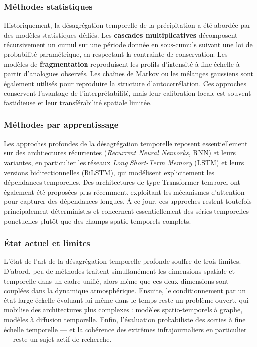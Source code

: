 \documentclass[14pt,a4paper,openany]{extreport}
\theoremstyle{definition}
\begin{document}
\subsubsection{Méthodes statistiques}

Historiquement, la désagrégation temporelle de la précipitation a été abordée par des modèles statistiques dédiés. Les \textbf{cascades multiplicatives} décomposent récursivement un cumul sur une période donnée en sous-cumuls suivant une loi de probabilité paramétrique, en respectant la contrainte de conservation. Les modèles de \textbf{fragmentation} reproduisent les profils d'intensité à fine échelle à partir d'analogues observés. Les chaînes de Markov ou les mélanges gaussiens sont également utilisés pour reproduire la structure d'autocorrélation. Ces approches conservent l'avantage de l'interprétabilité, mais leur calibration locale est souvent fastidieuse et leur transférabilité spatiale limitée.

\subsubsection{Méthodes par apprentissage}

Les approches profondes de la désagrégation temporelle reposent essentiellement sur des architectures récurrentes (\emph{Recurrent Neural Networks}, RNN) et leurs variantes, en particulier les réseaux \emph{Long Short-Term Memory} (LSTM) et leurs versions bidirectionnelles (BiLSTM), qui modélisent explicitement les dépendances temporelles. Des architectures de type Transformer temporel ont également été proposées plus récemment, exploitant les mécanismes d'attention pour capturer des dépendances longues. À ce jour, ces approches restent toutefois principalement déterministes et concernent essentiellement des séries temporelles ponctuelles plutôt que des champs spatio-temporels complets.

\subsubsection{État actuel et limites}

L'état de l'art de la désagrégation temporelle profonde souffre de trois limites. D'abord, peu de méthodes traitent simultanément les dimensions spatiale et temporelle dans un cadre unifié, alors même que ces deux dimensions sont couplées dans la dynamique atmosphérique. Ensuite, le conditionnement par un état large-échelle évoluant lui-même dans le temps reste un problème ouvert, qui mobilise des architectures plus complexes : modèles spatio-temporels à graphe, modèles à diffusion temporelle. Enfin, l'évaluation probabiliste des sorties à fine échelle temporelle --- et la cohérence des extrêmes infrajournaliers en particulier --- reste un sujet actif de recherche.
\end{document}
